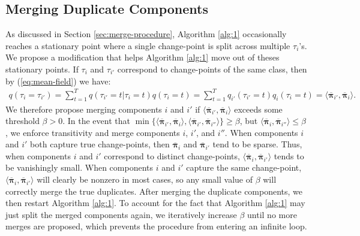 \subsection{Merging Duplicate Components}
\label{app:merge-procedure}

As discussed in Section \ref{sec:merge-procedure}, Algorithm \ref{alg:1} occasionally reaches a stationary point where a single change-point is split across multiple $\tau_i$'s. We propose a modification that helps Algorithm \ref{alg:1} move out of theses stationary points. If $\tau_i$ and $\tau_{i'}$ correspond to change-points of the same class, then by (\ref{eq:mean-field}) we have:
\begin{align}
    q(\tau_i = \tau_{i'}) = \sum_{t=1}^T q(\tau_{i'} = t | \tau_i = t ) q(\tau_i = t) = \sum_{t=1}^T q_{i'}(\tau_{i'} = t)q_i(\tau_i = t) = \langle\overline{\boldsymbol{\pi}}_{i'}, \overline{\boldsymbol{\pi}}_i \rangle.
\end{align}
We therefore propose merging components $i$ and $i'$ if $\langle\overline{\boldsymbol{\pi}}_{i'}, \overline{\boldsymbol{\pi}}_i \rangle$ exceeds some threshold $\beta > 0$. In the event that $\min\{\langle\overline{\boldsymbol{\pi}}_{i'}, \overline{\boldsymbol{\pi}}_i \rangle,\langle\overline{\boldsymbol{\pi}}_{i'}, \overline{\boldsymbol{\pi}}_{i''} \rangle\} \geq \beta$, but $\langle\overline{\boldsymbol{\pi}}_{i}, \overline{\boldsymbol{\pi}}_{i''} \rangle \leq \beta$, we enforce transitivity and merge components $i$, $i'$, and $i''$. When components $i$ and $i'$ both capture true change-points, then $\overline{\boldsymbol{\pi}}_{i}$ and $\overline{\boldsymbol{\pi}}_{i'}$ tend to be sparse. Thus, when components $i$ and $i'$ correspond to distinct change-points, $\langle\overline{\boldsymbol{\pi}}_{i}, \overline{\boldsymbol{\pi}}_{i'} \rangle$ tends to be vanishingly small. When components $i$ and $i'$ capture the same change-point, $\langle\overline{\boldsymbol{\pi}}_{i}, \overline{\boldsymbol{\pi}}_{i'}\rangle$ will clearly be nonzero in most cases, so any small value of $\beta$ will correctly merge the true duplicates. After merging the duplicate components, we then restart Algorithm \ref{alg:1}. To account for the fact that Algorithm \ref{alg:1} may just split the merged components again, we iteratively increase $\beta$ until no more merges are proposed, which prevents the procedure from entering an infinite loop. 

